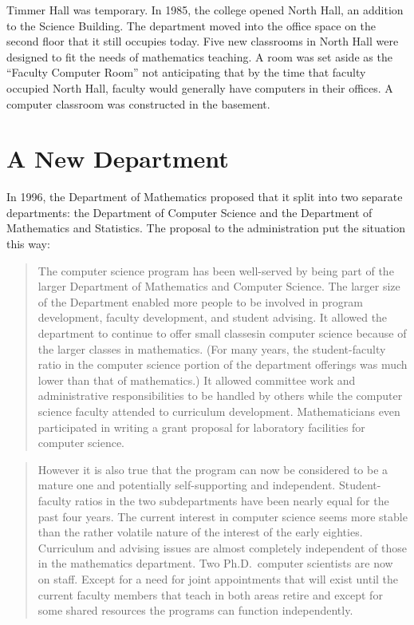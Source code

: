 \documentclass[
]{book}
\begin{document}
Timmer Hall was temporary. In 1985, the college opened North Hall, an addition to the Science Building. The department moved into the office space on the second floor that it still occupies today. Five new classrooms in North Hall were designed to fit the needs of mathematics teaching. A room was set aside as the ``Faculty Computer Room'' not anticipating that by the time that faculty occupied North Hall, faculty would generally have computers in their offices. A computer classroom was constructed in the basement.

\hypertarget{a-new-department}{%
\section{A New Department}\label{a-new-department}}

In 1996, the Department of Mathematics proposed that it split into two separate departments: the Department of Computer Science and the Department of Mathematics and Statistics. The proposal to the administration put the situation this way:

\begin{quote}
The computer science program has been well-served by being part of the larger Department of Mathematics and Computer Science. The larger size of the Department enabled more people to be involved in program development, faculty development, and student advising. It allowed the department to continue to offer small classesin computer science because of the larger classes in mathematics. (For many years, the student-faculty ratio in the computer science portion of the department offerings was much lower than that of mathematics.) It allowed committee work and administrative responsibilities to be handled by others while the computer science faculty attended to curriculum development. Mathematicians even participated in writing a grant proposal for laboratory facilities for computer science.
\end{quote}

\begin{quote}
However it is also true that the program can now be considered to be a mature one and potentially self-supporting and independent. Student-faculty ratios in the two subdepartments have been nearly equal for the past four years. The current interest in computer science seems more stable than the rather volatile nature
of the interest of the early eighties. Curriculum and advising issues are almost completely independent of those in the mathematics department. Two Ph.D.~computer scientists are now on staff. Except for a need for joint appointments that will exist until the current faculty members that teach in both areas retire and except for some shared resources the
programs can function independently.
\end{quote}
\end{document}
